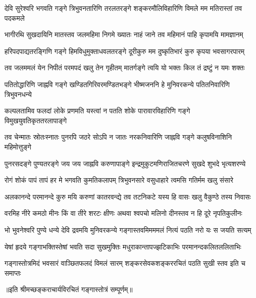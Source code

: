 

\twolineshloka
{देवि सुरेश्वरि भगवति गङ्गे त्रिभुवनतारिणि तरलतरङ्गे}
{शङ्करमौलिविहारिणि विमले मम मतिरास्तां तव पदकमले} %

\twolineshloka
{भागीरथि सुखदायिनि मातस्तव जलमहिमा निगमे ख्यातः}
{नाहं जाने तव महिमानं पाहि कृपामयि मामज्ञानम्} %

\twolineshloka
{हरिपदपाद्यतरङ्गिणि गङ्गे हिमविधुमुक्ताधवलतरङ्गे}
{दूरीकुरु मम दुष्कृतिभारं कुरु कृपया भवसागरपारम्} %

\twolineshloka
{तव जलममलं येन निपीतं परमपदं खलु तेन गृहीतम्}
{मातर्गङ्गे त्वयि यो भक्तः किल तं द्रष्टुं न यमः शक्तः} %

\twolineshloka
{पतितोद्धारिणि जाह्नवि गङ्गे खण्डितगिरिवरमण्डितभङ्गे}
{भीष्मजननि हे मुनिवरकन्ये पतितनिवारिणि त्रिभुवनधन्ये} %

\twolineshloka
{कल्पलतामिव फलदां लोके प्रणमति यस्त्वां न पतति शोके}
{पारावारविहारिणि गङ्गे विमुखयुवतिकृततरलापाङ्गे} %

\twolineshloka
{तव चेन्मातः स्रोतःस्नातः पुनरपि जठरे सोऽपि न जातः}
{नरकनिवारिणि जाह्नवि गङ्गे कलुषविनाशिनि महिमोत्तुङ्गे} %

\twolineshloka
{पुनरसदङ्गे पुण्यतरङ्गे जय जय जाह्नवि करुणापाङ्गे}
{इन्द्रमुकुटमणिराजितचरणे सुखदे शुभदे भृत्यशरण्ये} %

\twolineshloka
{रोगं शोकं पापं तापं हर मे भगवति कुमतिकलापम्}
{त्रिभुवनसारे वसुधाहारे त्वमसि गतिर्मम खलु संसारे} %

\twolineshloka
{अलकानन्दे परमानन्दे कुरु मयि करुणां कातरवन्द्ये}
{तव तटनिकटे यस्य हि वासः खलु वैकुण्ठे तस्य निवासः} %

\twolineshloka
{वरमिह नीरे कमठो मीनः किं वा तीरे शरटः क्षीणः}
{अथवा श्वपचो मलिनो दीनस्तव न हि दूरे नृपतिकुलीनः} %

\twolineshloka
{भो भुवनेश्वरि पुण्ये धन्ये देवि द्रवमयि मुनिवरकन्ये}
{गङ्गास्तवमिमममलं नित्यं पठति नरो यः स जयति सत्यम्} %

\twolineshloka
{येषां हृदये गङ्गाभक्तिस्तेषां भवति सदा सुखमुक्तिः}
{मधुराकान्तापज्झटिकाभिः परमानन्दकलितललिताभिः} %

\twolineshloka
{गङ्गास्तोत्रमिदं भवसारं वाञ्छितफलदं विमलं सारम्}
{शङ्करसेवकशङ्कररचितं पठति सुखी स्तव इति च समाप्तः} %

{॥इति श्रीमच्छङ्कराचार्यविरचितं गङ्गास्तोत्रं सम्पूर्णम्॥}
